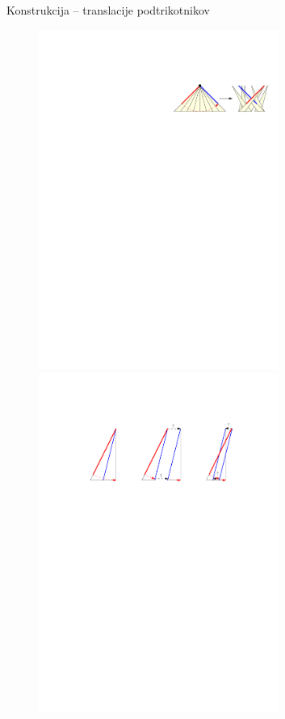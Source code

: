 \documentclass{beamer}
\begin{document}

\begin{frame}{Konstrukcija -- translacije podtrikotnikov}
    \begin{figure}
        \centering
        \includegraphics[width=0.7\textwidth]{ipe_slike/translacija_podtrikotnikov.pdf}
        \pause
        \includegraphics[width=0.7\textwidth]{ipe_slike/preskok1.pdf}
    \end{figure}
\end{frame}
\end{document}
